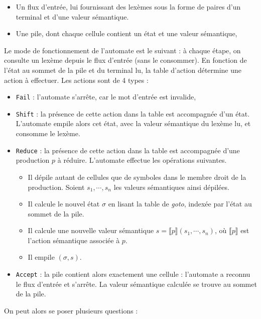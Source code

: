 \documentclass[a4paper,11pt]{article}
\begin{document}
\begin{itemize}
\item Un flux d'entrée, lui fournissant des lexèmes sous la forme
  de paires d'un terminal et d'une valeur sémantique.
\item Une pile, dont chaque cellule contient un état et une valeur
  sémantique,
\end{itemize}

Le mode de fonctionnement de l'automate est le suivant : à chaque
étape, on consulte un lexème depuis le flux d'entrée (sans le
consommer). En fonction de l'état au sommet de la pile et du terminal
lu, la table d'action détermine une action à effectuer. Les actions
sont de 4 types :

\begin{itemize}
\item \texttt{Fail} : l'automate s'arrête, car le mot d'entrée est
  invalide,
\item \texttt{Shift} : la présence de cette action dans la table
  est accompagnée d'un état. L'automate empile alors cet état, avec la
  valeur sémantique du lexème lu, et consomme le lexème.
\item \texttt{Reduce} : la présence de cette action dans la table est
  accompagnée d'une production $p$ à réduire. L'automate effectue les
  opérations suivantes.
\begin{itemize}
  \item Il dépile autant de cellules que de symboles dans le membre
    droit de la production. Soient $s_1, \cdots, s_n$ les valeurs
    sémantiques ainsi dépilées.
  \item Il calcule le nouvel état $\sigma$ en lisant la table de
    \emph{goto}, indexée par l'état au sommet de la pile.
  \item Il calcule une nouvelle valeur sémantique $s = \llbracket p
    \rrbracket(s_1, \cdots, s_n)$, où $\llbracket p \rrbracket$ est
    l'action sémantique associée à $p$.
  \item Il empile $(\sigma, s)$.
\end{itemize}
\item \texttt{Accept} : la pile contient alors exactement une
  cellule : l'automate a reconnu le flux d'entrée et s'arrête. La
  valeur sémantique calculée se trouve au sommet de la pile.
\end{itemize}

On peut alors se poser plusieurs questions :
\end{document}

